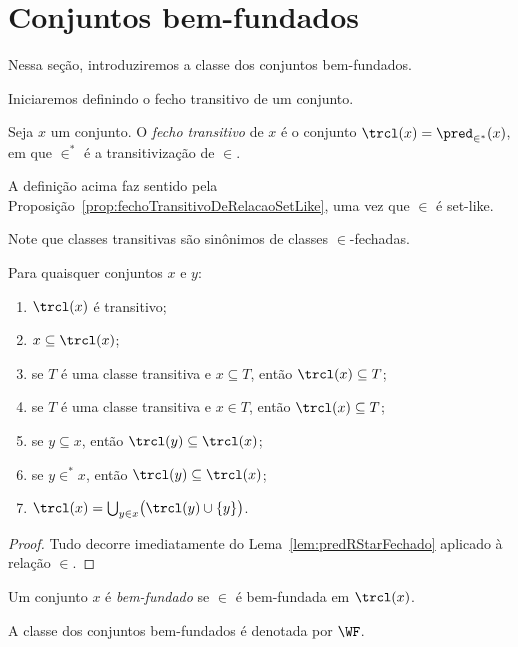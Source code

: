 \section{Conjuntos bem-fundados}\label{sec:conjuntosBemFundados}
Nessa seção, introduziremos a classe dos conjuntos bem-fundados.

Iniciaremos definindo o fecho transitivo de um conjunto.
\begin{definition}[$\ZFmP$]
    Seja $x$ um conjunto.
    O \emph{fecho transitivo} de $x$ é o conjunto $\trcl(x)=\pred_{\in^*}(x)$, em que $\in^*$ é a transitivização de $\in$.
\end{definition}

A definição acima faz sentido pela Proposição~\ref{prop:fechoTransitivoDeRelacaoSetLike}, uma vez que $\in$ é set-like.

Note que classes transitivas são sinônimos de classes $\in$-fechadas.
\begin{proposition}[$\ZFmP$]\label{prop:propriedadesFechoTransitivo}
    Para quaisquer conjuntos $x$ e $y$:
    \begin{enumerate}[label=(\alph*)]
        \item $\trcl(x)$ é transitivo;
        \item $x\subseteq \trcl(x)$;
        \item se $T$ é uma classe transitiva e $x\subseteq T$, então $\trcl(x)\subseteq T$;
        \item se $T$ é uma classe transitiva e $x\in T$, então $\trcl(x)\subseteq T$;
        \item se $y\subseteq x$, então $\trcl(y)\subseteq \trcl(x)$;
        \item se $y\in^* x$, então $\trcl(y)\subseteq \trcl(x)$;
        \item $\trcl(x)=\bigcup_{y \in x}\bigl(\trcl(y)\cup\{y\}\bigr)$.
    \end{enumerate}
\end{proposition}
\begin{proof}
    Tudo decorre imediatamente do Lema~\ref{lem:predRStarFechado} aplicado à relação $\in$.
\end{proof}

\begin{definition}[$\ZFmP$]
    Um conjunto $x$ é \textit{bem-fundado} se $\in$ é bem-fundada em $\trcl(x)$.

    A classe dos conjuntos bem-fundados é denotada por $\WF$.
\end{definition}

